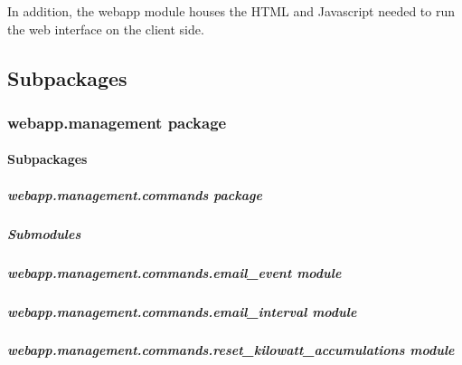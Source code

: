 \documentclass[letterpaper,10pt,english]{sphinxmanual}
\begin{document}
In addition, the webapp module houses the HTML and Javascript needed to run the web interface on the client side.


\subsection{Subpackages}
\label{modules/webapp:subpackages}

\subsubsection{webapp.management package}
\label{modules/webapp.management::doc}\label{modules/webapp.management:webapp-management-package}

\paragraph{Subpackages}
\label{modules/webapp.management:subpackages}

\subparagraph{webapp.management.commands package}
\label{modules/webapp.management.commands::doc}\label{modules/webapp.management.commands:webapp-management-commands-package}

\subparagraph{Submodules}
\label{modules/webapp.management.commands:submodules}

\subparagraph{webapp.management.commands.email\_event module}
\label{modules/webapp.management.commands:webapp-management-commands-email-event-module}

\subparagraph{webapp.management.commands.email\_interval module}
\label{modules/webapp.management.commands:webapp-management-commands-email-interval-module}

\subparagraph{webapp.management.commands.reset\_kilowatt\_accumulations module}
\label{modules/webapp.management.commands:module-webapp.management.commands.reset_kilowatt_accumulations}\label{modules/webapp.management.commands:webapp-management-commands-reset-kilowatt-accumulations-module}
\end{document}
